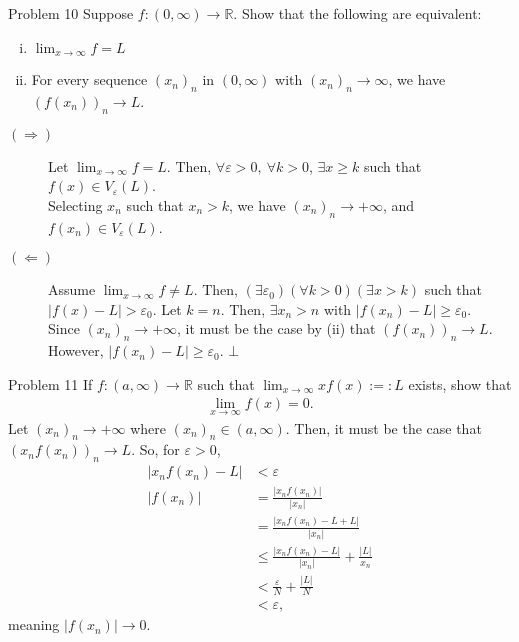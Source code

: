 \documentclass[10pt]{extarticle}
\newcommand{\R}{\mathbb{R}}
\begin{document}
  \begin{problem}{Problem 10}
    Suppose $f:(0,\infty) \rightarrow \R$. Show that the following are equivalent:
    \begin{enumerate}[(i)]
      \item $\displaystyle\lim_{x\rightarrow\infty} f = L$
      \item For every sequence $(x_n)_n$ in $(0,\infty)$ with $(x_n)_n \rightarrow \infty$, we have $(f(x_n))_n \rightarrow L$.
    \end{enumerate}
    \tcblower
    \begin{description}
      \item[$(\Rightarrow)$] Let $\lim_{x\rightarrow\infty} f = L$. Then, $\forall \varepsilon > 0,~\forall k > 0$, $\exists x \geq k$ such that $f(x)\in V_{\varepsilon}(L)$.\\

        Selecting $x_n$ such that $x_n > k$, we have $(x_n)_n \rightarrow +\infty$, and $f(x_n)\in V_{\varepsilon}(L)$.
      \item[$(\Leftarrow)$] Assume $\lim_{x\rightarrow\infty}f \neq L$. Then, $(\exists \varepsilon_0)(\forall k > 0)(\exists x > k)$ such that $|f(x) - L| > \varepsilon_0$. Let $k = n$. Then, $\exists x_n > n$ with $|f(x_n) - L|\geq \varepsilon_0$.\\

        Since $(x_n)_n \rightarrow +\infty$, it must be the case by (ii) that $(f(x_n))_n \rightarrow L$. However, $|f(x_n) - L| \geq \varepsilon_0$. $\bot$
    \end{description}
  \end{problem}
  \begin{problem}{Problem 11}
    If $f:(a,\infty) \rightarrow \R$ such that $\lim_{x\rightarrow\infty}xf(x) :=: L$ exists, show that
    \begin{align*}
      \lim_{x\rightarrow\infty}f(x) = 0.
    \end{align*}
    \tcblower
    Let $(x_n)_n \rightarrow +\infty$ where $(x_n)_n \in (a,\infty)$. Then, it must be the case that $\left(x_nf(x_n)\right)_n \rightarrow L$. So, for $\varepsilon > 0$,
    \begin{align*}
      |x_nf(x_n) - L| &< \varepsilon\\
      |f(x_n)| &= \frac{|x_nf(x_n)|}{|x_n|}\\
               &= \frac{|x_nf(x_n)-L+L|}{|x_n|}\\
               &\leq \frac{|x_nf(x_n) - L|}{|x_n|} + \frac{|L|}{x_n}\\
               &< \frac{\varepsilon}{N} + \frac{|L|}{N} \tag*{for $N$ large, by the Archimedean Property}\\
               &< \varepsilon,
    \end{align*}
    meaning $|f(x_n)| \rightarrow 0$.
  \end{problem}
\end{document}
